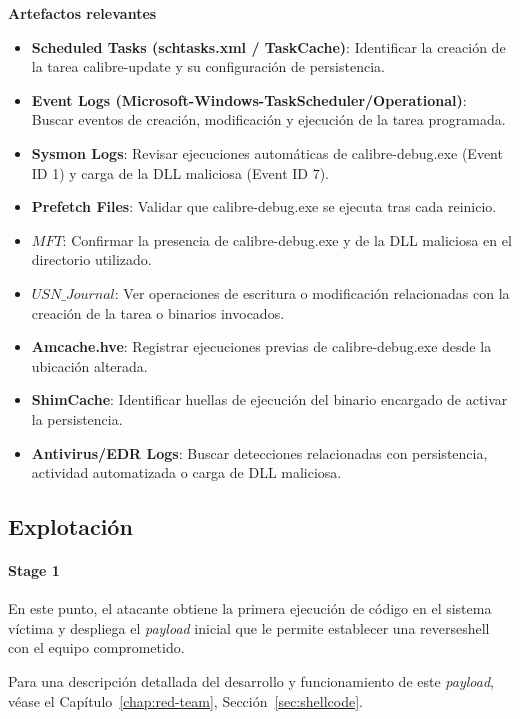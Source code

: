 \textbf{Artefactos relevantes}
\begin{itemize}
    \item \textbf{Scheduled Tasks (schtasks.xml / TaskCache)}: Identificar la creación de la tarea calibre-update y su configuración de persistencia.
    \item \textbf{Event Logs (Microsoft-Windows-TaskScheduler/Operational)}: Buscar eventos de creación, modificación y ejecución de la tarea programada.
    \item \textbf{Sysmon Logs}: Revisar ejecuciones automáticas de calibre-debug.exe (Event ID 1) y carga de la DLL maliciosa (Event ID 7).
    \item \textbf{Prefetch Files}: Validar que calibre-debug.exe se ejecuta tras cada reinicio.
    \item \textbf{$MFT$}: Confirmar la presencia de calibre-debug.exe y de la DLL maliciosa en el directorio utilizado.
    \item \textbf{$USN\_Journal$}: Ver operaciones de escritura o modificación relacionadas con la creación de la tarea o binarios invocados.
    \item \textbf{Amcache.hve}: Registrar ejecuciones previas de calibre-debug.exe desde la ubicación alterada.
    \item \textbf{ShimCache}: Identificar huellas de ejecución del binario encargado de activar la persistencia.
    \item \textbf{Antivirus/EDR Logs}: Buscar detecciones relacionadas con persistencia, actividad automatizada o carga de DLL maliciosa.
\end{itemize}

\subsection{Explotación}

\paragraph{Stage 1} En este punto, el atacante obtiene la primera ejecución de código en el sistema víctima y despliega el \textit{payload} inicial que le permite establecer una reverseshell con el equipo comprometido.

Para una descripción detallada del desarrollo y funcionamiento de este \textit{payload}, véase el Capítulo~\ref{chap:red-team}, Sección~\ref{sec:shellcode}.

